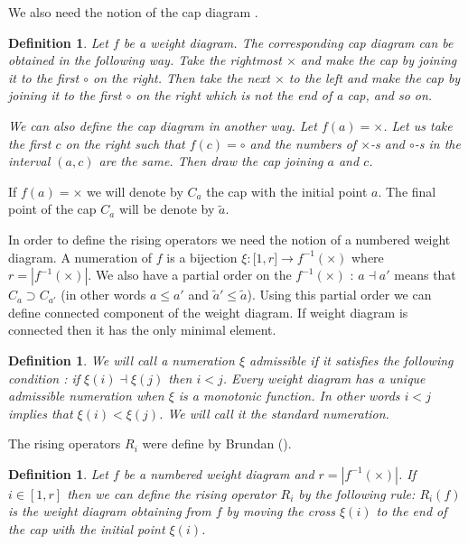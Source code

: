 \documentclass[12pt,reqno]{amsart}
\newtheorem{definition}[thm]{Definition}
\begin{document}
We also need  the notion of   the cap diagram \cite{BS}.
\begin{definition} Let $f$ be a weight diagram.  The corresponding cap diagram can be obtained in the following way. Take the rightmost  $\times$ and make the cap by joining it to the first $\circ$ on the right. Then take the next $\times $ to the left  and make the cap by joining it  to the first $\circ$ on the right which is not the end of a cap, and so on. 

We can also define the cap diagram in another way. Let $f(a)=\times$. Let us take the first $c$ on the right such that $f(c)=\circ$ and  the numbers of $\times$-s and $\circ$-s in the interval $(a,c)$  are the same. Then draw the cap joining $a$ and $c$. 
\end{definition}

If $f(a)=\times$ we will denote  by $C_a$ the cap with the initial point $a$. The final point of the cap $C_a$ will be denote by $\tilde a$. 

 In order to define the rising operators   we need the notion of a numbered weight  diagram.  A numeration  of $f$ is a  bijection $\xi: \mathcal [1,r]\rightarrow f^{-1}(\times)$ where $r=| f^{-1}(\times) |$.  We also have a partial  order on the $f^{-1}(\times)$ : $a\dashv a'$ means that $C_a\supset C_{a'}$ (in other words $a\le a'$ and $\tilde a'\le \tilde a$). Using this partial order we can define connected component of the weight diagram.  If weight diagram is connected   then it has the only minimal element.

\begin{definition}
 We will call a numeration  $\xi$  admissible  if  it satisfies the following condition : if $\xi(i)\dashv\xi(j)$ then $i<j$. Every weight diagram has a unique admissible numeration when $\xi$ is a monotonic function. In other words $i<j$ implies that $\xi(i)<\xi(j)$. We will call it the standard numeration.
 \end{definition}

 The rising operators $R_i$ were  define by Brundan  (\cite{B}).

\begin{definition} Let  $f$  be  a numbered  weight  diagram  and $r=|f^{-1}(\times)|$.  If $i\in [1,r]$ then  we can define the rising operator $R_i$  by the following rule:  $R_i(f)$ is  the weight diagram  obtaining  from $f$ by moving the cross $\xi(i)$ to the end of the cap with the initial  point $\xi(i)$. 
\end{definition}
\end{document}
